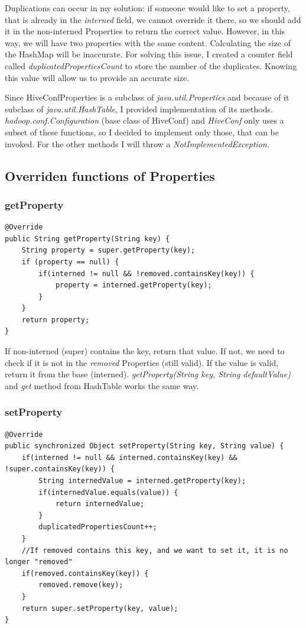Duplications can occur in my solution: if someone would like to set a property, that is already in the \textit{interned} field, we cannot override it there, so we should add it in the non-interned Properties to return the correct value. However, in this way, we will have two properties with the same content. Calculating the size of the HashMap will be inaccurate. For solving this issue, I created a counter field called \textit{duplicatedPropertiesCount} to store the number of the duplicates. Knowing this value will allow us to provide an accurate size. 

Since HiveConfProperties is a subclass of \textit{java.util.Properties} and because of it subclass of \textit{java.util.HashTable}, I provided implementation of its methods.  \textit{hadoop.conf.Configuration} (base class of HiveConf) and \textit{HiveConf} only uses a subset of these functions, so I decided to implement only those, that can be invoked. For the other methods I will throw a \textit{NotImplementedException}. 

\subsection{Overriden functions of Properties}
\subsubsection{getProperty}
\begin{lstlisting}
@Override
public String getProperty(String key) {
	String property = super.getProperty(key);
	if (property == null) {
		if(interned != null && !removed.containsKey(key)) {
			property = interned.getProperty(key);
		}
	}
	return property;
}
\end{lstlisting}

If non-interned (super) contains the key, return that value. If not, we need to check if it is not in the \textit{removed} Properties (still valid). If the value is valid, return it from the base (interned). \textit{getProperty(String key, String defaultValue)} and \textit{get} method from HashTable works the same way. 
\subsubsection{setProperty}
\begin{lstlisting}
@Override
public synchronized Object setProperty(String key, String value) {
	if(interned != null && interned.containsKey(key) && !super.containsKey(key)) {
		String internedValue = interned.getProperty(key);
		if(internedValue.equals(value)) {
			return internedValue;
		}
		duplicatedPropertiesCount++;
	}
	//If removed contains this key, and we want to set it, it is no longer "removed"
	if(removed.containsKey(key)) {
		removed.remove(key);
	}
	return super.setProperty(key, value);
}
\end{lstlisting}

